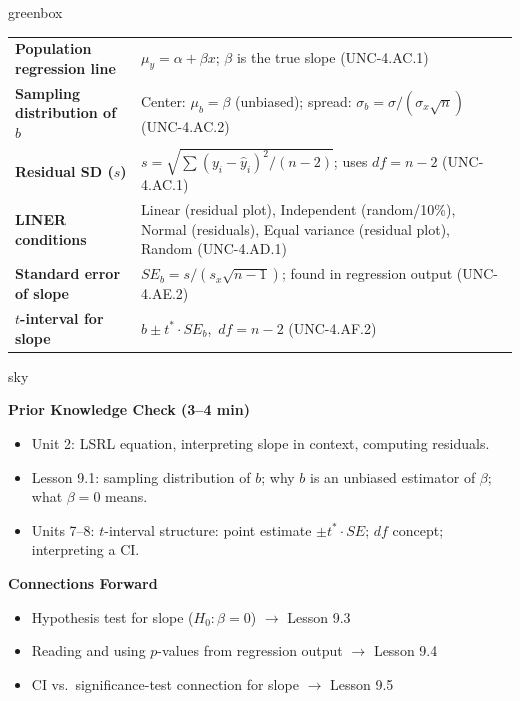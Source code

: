 \documentclass[10pt]{article}
\begin{document}
\begin{skillbox}{greenbox}
\renewcommand{\arraystretch}{1.3}
\begin{tabularx}{\linewidth}{lX}
    \textbf{Population regression line} &
        $\mu_y = \alpha + \beta x$; $\beta$ is the true slope (UNC-4.AC.1) \\
    \textbf{Sampling distribution of $b$} &
        Center: $\mu_b = \beta$ (unbiased); spread: $\sigma_b = \sigma/(\sigma_x\sqrt{n})$
        (UNC-4.AC.2) \\
    \textbf{Residual SD ($s$)} &
        $s = \sqrt{\sum(y_i - \hat{y}_i)^2/(n-2)}$; uses $df = n-2$ (UNC-4.AC.1) \\
    \textbf{LINER conditions} &
        Linear (residual plot), Independent (random/10\%), Normal (residuals),
        Equal variance (residual plot), Random (UNC-4.AD.1) \\
    \textbf{Standard error of slope} &
        $SE_b = s/(s_x\sqrt{n-1})$; found in regression output (UNC-4.AE.2) \\
    \textbf{$t$-interval for slope} &
        $b \pm t^* \cdot SE_b$,\ $df = n-2$ (UNC-4.AF.2) \\
\end{tabularx}
\end{skillbox}

\begin{skillbox}{sky}
\begin{minipage}[t]{0.48\linewidth}
    \textbf{Prior Knowledge Check (3--4 min)}
    \begin{itemize}
        \item Unit 2: LSRL equation, interpreting slope in context, computing residuals.
        \item Lesson 9.1: sampling distribution of $b$; why $b$ is an unbiased estimator
              of $\beta$; what $\beta = 0$ means.
        \item Units 7--8: $t$-interval structure: point estimate $\pm t^* \cdot SE$;
              $df$ concept; interpreting a CI.
    \end{itemize}
\end{minipage}
\hfill
\begin{minipage}[t]{0.48\linewidth}
    \textbf{Connections Forward}
    \begin{itemize}
        \item Hypothesis test for slope ($H_0\colon \beta = 0$) $\to$ Lesson 9.3
        \item Reading and using $p$-values from regression output $\to$ Lesson 9.4
        \item CI vs.\ significance-test connection for slope $\to$ Lesson 9.5
    \end{itemize}
\end{minipage}
\end{skillbox}
\end{document}
